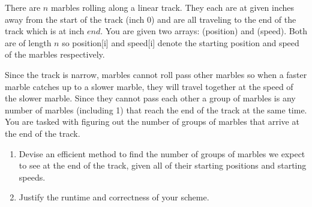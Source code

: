 \documentclass{cs0500}
\begin{document}
\begin{problem}
There are $n$ marbles rolling along a linear track. They each are at given inches away from the start of the track (inch 0) and are all traveling to the end of the track which is at inch $end$. You are given two arrays: (position) and (speed). Both are of length $n$ so position[i] and speed[i] denote the starting position and speed of the marbles respectively. 

    
Since the track is narrow, marbles cannot roll pass other marbles so when a faster marble catches up to a slower marble, they will travel together at the speed of the slower marble. Since they cannot pass each other a group of marbles is any number of marbles (including 1) that reach the end of the track at the same time. You are tasked with figuring out the number of groups of marbles that arrive at the end of the track. 
    
\begin{enumerate}
    \item Devise an efficient method to find the number of groups of marbles we expect to see at the end of the track, given all of their starting positions and starting speeds. 
    
    \item Justify the runtime and correctness of your scheme.
\end{enumerate}
\end{problem}
\end{document}
